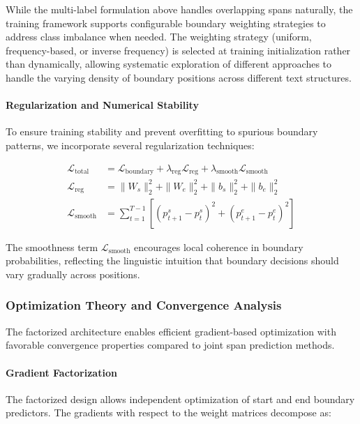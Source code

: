 While the multi-label formulation above handles overlapping spans naturally, the training framework supports configurable boundary weighting strategies to address class imbalance when needed. The weighting strategy (uniform, frequency-based, or inverse frequency) is selected at training initialization rather than dynamically, allowing systematic exploration of different approaches to handle the varying density of boundary positions across different text structures.

\paragraph{Regularization and Numerical Stability}

To ensure training stability and prevent overfitting to spurious boundary patterns, we incorporate several regularization techniques:

\begin{align}
\mathcal{L}_{\text{total}} &= \mathcal{L}_{\text{boundary}} + \lambda_{\text{reg}} \mathcal{L}_{\text{reg}} + \lambda_{\text{smooth}} \mathcal{L}_{\text{smooth}} \label{eq:total-loss} \\
\mathcal{L}_{\text{reg}} &= \|W_s\|_2^2 + \|W_e\|_2^2 + \|b_s\|_2^2 + \|b_e\|_2^2 \label{eq:l2-regularization} \\
\mathcal{L}_{\text{smooth}} &= \sum_{t=1}^{T-1} \left[ (p^s_{t+1} - p^s_t)^2 + (p^e_{t+1} - p^e_t)^2 \right] \label{eq:smoothness-regularization}
\end{align}

The smoothness term \(\mathcal{L}_{\text{smooth}}\) encourages local coherence in boundary probabilities, reflecting the linguistic intuition that boundary decisions should vary gradually across positions.

\subsubsection{Optimization Theory and Convergence Analysis}
\label{sec:span-predictor-optimization}

The factorized architecture enables efficient gradient-based optimization with favorable convergence properties compared to joint span prediction methods.

\paragraph{Gradient Factorization}

The factorized design allows independent optimization of start and end boundary predictors. The gradients with respect to the weight matrices decompose as:

